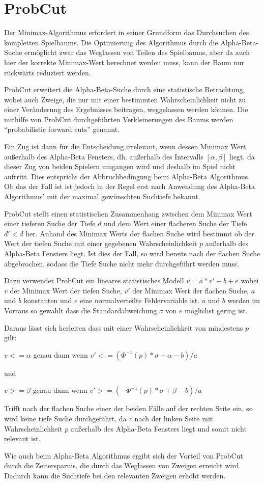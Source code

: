 \section{ProbCut}

Der Minimax-Algorithmus erfordert in seiner Grundform das Durchsuchen des kompletten Spielbaums.
Die Optimierung des Algorithmus durch die Alpha-Beta-Suche ermöglicht zwar das Weglassen von Teilen des Spielbaums, aber da auch hier der korrekte Minimax-Wert berechnet werden muss, kann der Baum nur rückwärts reduziert werden.

ProbCut erweitert die Alpha-Beta-Suche durch eine statistische Betrachtung, wobei auch Zweige, die nur mit einer bestimmten Wahrscheinlichkeit nicht zu einer Veränderung des Ergebnisses beitragen, weggelassen werden können.
Die mithilfe von ProbCut durchgeführten Verkleinerungen des Baums werden "`probabilistic forward cuts"' genannt.

Ein Zug ist dann für die Entscheidung irrelevant, wenn dessen Minimax Wert außerhalb des Alpha-Beta Fensters, dh. außerhalb des Intervalls \([\alpha,\beta]\) liegt, da dieser Zug von beiden Spielern umgangen wird und deshalb im Spiel nicht auftritt.
Dies entspricht der Abbruchbedingung beim Alpha-Beta Algorithmus.
Ob das der Fall ist ist jedoch in der Regel erst nach Anwendung des Alpha-Beta Algorithmus' mit der maximal gewünschten Suchtiefe bekannt.

ProbCut stellt einen statistischen Zusammenhang zwischen dem Minimax Wert einer tieferen Suche der Tiefe \(d\) und dem Wert einer flacheren Suche der Tiefe \(d'<d\) her.
Anhand des Minimax Werts der flachen Suche wird bestimmt ob der Wert der tiefen Suche mit einer gegebenen Wahrscheinlichkeit \(p\) außerhalb des Alpha-Beta Fensters liegt.
Ist dies der Fall, so wird bereits nach der flachen Suche abgebrochen, sodass die Tiefe Suche nicht mehr durchgeführt werden muss.

Dazu verwendet ProbCut ein lineares statistisches Modell \(v=a*v'+b+e\) wobei \(v\) der Minimax Wert der tiefen Suche, \(v'\) der Minimax Wert der flachen Suche, \(a\) und \(b\) konstanten und \(e\) eine normalverteilte Fehlervariable ist.
\(a\) und \(b\) werden im Vorraus so gewählt dass die Standardabweichung \(\sigma\) von \(e\) möglichst gering ist.

Daraus lässt sich herleiten dass mit einer Wahrscheinlichkeit von mindestens \(p\) gilt:

\(v<=\alpha\) genau dann wenn \(v'<=(\Phi^{-1}(p)*\sigma+\alpha-b)/a\)

und

\(v>=\beta\) genau dann wenn \(v'>=(-\Phi^{-1}(p)*\sigma+\beta-b)/a\)

Trifft nach der flachen Suche einer der beiden Fälle auf der rechten Seite ein, so wird keine tiefe Suche durchgeführt, da \(v\) nach der linken Seite mit Wahrscheinlichkeit \(p\) außerhalb des Alpha-Beta Fensters liegt
und somit nicht relevant ist.

Wie auch beim Alpha-Beta Algorithmus ergibt sich der Vorteil von ProbCut durch die Zeitersparnis, die durch das Weglassen von Zweigen erreicht wird. Dadurch kann die Suchtiefe bei den relevanten Zweigen erhöht werden.
\cite[S.~1]{probcut}
